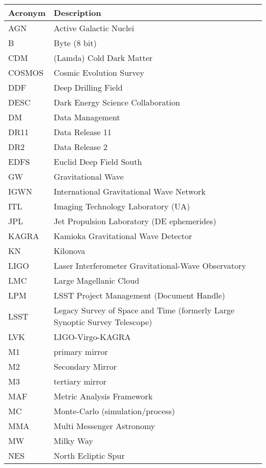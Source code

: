\addtocounter{table}{-1}
\begin{longtable}{p{}p{}}\hline
\textbf{Acronym} & \textbf{Description}  \\\hline

AGN & Active Galactic Nuclei \\\hline
B & Byte (8 bit) \\\hline
CDM & (Lamda) Cold Dark Matter \\\hline
COSMOS & Cosmic Evolution Survey \\\hline
DDF & Deep Drilling Field \\\hline
DESC & Dark Energy Science Collaboration \\\hline
DM & Data Management \\\hline
DR11 & Data Release 11 \\\hline
DR2 & Data Release 2 \\\hline
EDFS & Euclid Deep Field South \\\hline
GW & Gravitational Wave \\\hline
IGWN & International Gravitational Wave Network \\\hline
ITL & Imaging Technology Laboratory (UA) \\\hline
JPL & Jet Propulsion Laboratory (DE ephemerides) \\\hline
KAGRA & Kamioka Gravitational Wave Detector \\\hline
KN & Kilonova \\\hline
LIGO & Laser Interferometer Gravitational-Wave Observatory \\\hline
LMC & Large Magellanic Cloud \\\hline
LPM & LSST Project Management (Document Handle) \\\hline
LSST & Legacy Survey of Space and Time (formerly Large Synoptic Survey Telescope) \\\hline
LVK & LIGO-Virgo-KAGRA \\\hline
M1 & primary mirror \\\hline
M2 & Secondary Mirror \\\hline
M3 & tertiary mirror \\\hline
MAF & Metric Analysis Framework \\\hline
MC & Monte-Carlo (simulation/process) \\\hline
MMA & Multi Messenger Astronomy \\\hline
MW & Milky Way \\\hline
NES & North Ecliptic Spur \\\hline

\end{longtable}
